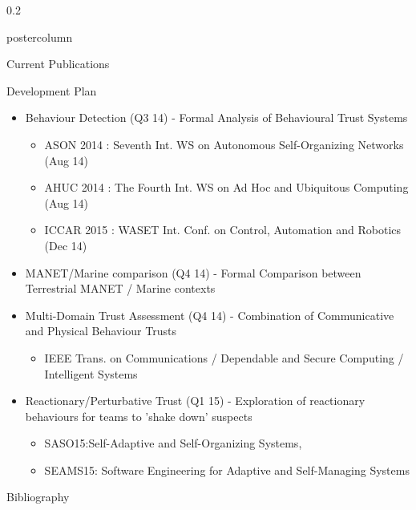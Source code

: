 \documentclass[final,hyperref={pdfpagelabels=false}]{beamer}
\def\colwidth{0.2\linewidth}
\begin{document}
\begin{frame}[fragile]
\begin{columns}[T]
\begin{column}{\colwidth}
\begin{beamercolorbox}[center,wd=\textwidth]{postercolumn}
\begin{minipage}[T]{.98\textwidth}
{\begin{block}{Current Publications}
\begin{itemize}
            \end{itemize}


          \end{block}

          \begin{block}{Development Plan}
            \begin{itemize}
              \item Behaviour Detection (Q3 14) - Formal Analysis of Behavioural Trust Systems
                \begin{itemize}
                  \item ASON 2014 : Seventh Int. WS on Autonomous Self-Organizing Networks (Aug 14)
                  \item AHUC 2014 : The Fourth Int. WS on Ad Hoc and Ubiquitous Computing (Aug 14)
                  \item ICCAR 2015 : WASET Int. Conf. on Control, Automation and Robotics (Dec 14)
                \end{itemize}
              \item MANET/Marine comparison (Q4 14) - Formal Comparison between Terrestrial MANET / Marine contexts
              \item Multi-Domain Trust Assessment (Q4 14) - Combination of Communicative and Physical Behaviour Trusts
                \begin{itemize}
                  \item IEEE Trans. on Communications / Dependable and Secure Computing / Intelligent Systems
                \end{itemize}
              \item Reactionary/Perturbative Trust (Q1 15) - Exploration of reactionary behaviours for teams to 'shake down' suspects
                \begin{itemize}
                  \item SASO15:Self-Adaptive and Self-Organizing Systems, 
                  \item SEAMS15: Software Engineering for Adaptive and Self-Managing Systems
                \end{itemize}
            \end{itemize}

          \end{block}




            \begin{block}{Bibliography}


\end{block}}
\end{minipage}
\end{beamercolorbox}
\end{column}
\end{columns}
\end{frame}
\end{document}
